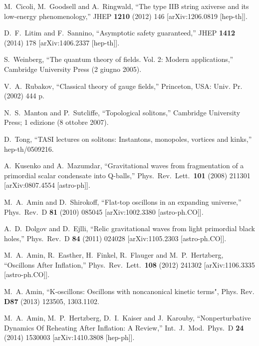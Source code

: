 \documentclass[11pt,a4paper]{article}
\begin{document}
\begin{thebibliography}{99}
  M.~Cicoli, M.~Goodsell and A.~Ringwald,
  ``The type IIB string axiverse and its low-energy phenomenology,''
  JHEP {\bf 1210} (2012) 146
  [arXiv:1206.0819 [hep-th]].
  
 D.~F.~Litim and F.~Sannino,
``Asymptotic safety guaranteed,''
 JHEP {\bf 1412} (2014) 178
 [arXiv:1406.2337 [hep-th]].
  
  S.~Weinberg,
  ``The quantum theory of fields. Vol. 2: Modern applications,''
  Cambridge University Press (2 giugno 2005).
  
  V.~A.~Rubakov,
  ``Classical theory of gauge fields,''
  Princeton, USA: Univ. Pr. (2002) 444 p.
  
  N.~S.~Manton and P.~Sutcliffe,
  ``Topological solitons,''
  Cambridge University Press; 1 edizione (8 ottobre 2007).
  
  D.~Tong,
  ``TASI lectures on solitons: Instantons, monopoles, vortices and kinks,''
  hep-th/0509216.
  
  A.~Kusenko and A.~Mazumdar,
  ``Gravitational waves from fragmentation of a primordial scalar condensate into Q-balls,''
  Phys.\ Rev.\ Lett.\  {\bf 101} (2008) 211301
  [arXiv:0807.4554 [astro-ph]].
  
  M.~A.~Amin and D.~Shirokoff,
  ``Flat-top oscillons in an expanding universe,''
  Phys.\ Rev.\ D {\bf 81} (2010) 085045
  [arXiv:1002.3380 [astro-ph.CO]].
  
  A.~D.~Dolgov and D.~Ejlli,
  ``Relic gravitational waves from light primordial black holes,''
  Phys.\ Rev.\ D {\bf 84} (2011) 024028
  [arXiv:1105.2303 [astro-ph.CO]].
  
  M.~A.~Amin, R.~Easther, H.~Finkel, R.~Flauger and M.~P.~Hertzberg,
  ``Oscillons After Inflation,''
  Phys.\ Rev.\ Lett.\  {\bf 108} (2012) 241302
  [arXiv:1106.3335 [astro-ph.CO]].
  
M.~A. Amin,
``K-oscillons: Oscillons with noncanonical kinetic terms",
 Phys. Rev. \textbf{D87} (2013) 123505, 1303.1102.
 
  M.~A.~Amin, M.~P.~Hertzberg, D.~I.~Kaiser and J.~Karouby,
  ``Nonperturbative Dynamics Of Reheating After Inflation: A Review,''
  Int.\ J.\ Mod.\ Phys.\ D {\bf 24} (2014) 1530003
  [arXiv:1410.3808 [hep-ph]].  
  

\end{thebibliography}
\end{document}

